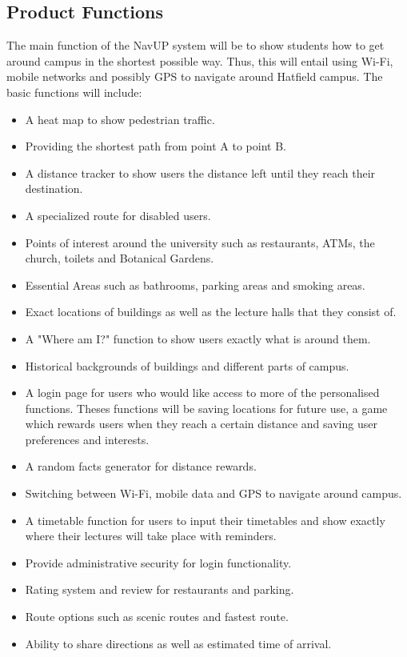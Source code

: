 \documentclass{article}
\begin{document}
		\subsection{Product Functions} {The main function of the NavUP system will be to show students how to get around campus in the shortest possible way. Thus, this will entail using Wi-Fi, mobile networks and possibly GPS to navigate around Hatfield campus. The basic functions will include:  }
	\begin{itemize}
  		\item A heat map to show pedestrian traffic.
		\item Providing the shortest path from point A to point B.
 		 \item A distance tracker to show users the distance left until they reach their destination.
		\item A specialized route for disabled users.
		\item Points of interest around the university such as restaurants, ATMs, the church, toilets and Botanical Gardens.
 		 \item Essential Areas such as bathrooms, parking areas and smoking areas.
		\item Exact locations of buildings as well as the lecture halls that they consist of.
		\item A "Where am I?" function to show users exactly what is around them.
 		 \item Historical backgrounds of buildings and different parts of campus.
		\item A login page for users who would like access to more of the personalised functions. Theses functions will be saving locations for future use, a game which rewards users when they reach a certain distance and saving user preferences and interests.
		\item A random facts generator for distance rewards.
		\item Switching between Wi-Fi, mobile data and GPS to navigate around campus.
		\item A timetable function for users to input their timetables and show exactly where their lectures will take place with reminders.
		\item Provide administrative security for login functionality.
		\item Rating system and review for restaurants and parking.
		\item Route options such as scenic routes and fastest route.
		\item Ability to share directions as well as estimated time of arrival.
	\end{itemize}
\end{document}
